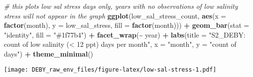\documentclass[
]{article}
\newenvironment{Shaded}{\begin{snugshade}}{\end{snugshade}}
\newcommand{\AttributeTok}[1]{\textcolor[rgb]{0.13,0.29,0.53}{#1}}
\newcommand{\CommentTok}[1]{\textcolor[rgb]{0.56,0.35,0.01}{\textit{#1}}}
\newcommand{\FunctionTok}[1]{\textcolor[rgb]{0.13,0.29,0.53}{\textbf{#1}}}
\newcommand{\NormalTok}[1]{#1}
\newcommand{\SpecialCharTok}[1]{\textcolor[rgb]{0.81,0.36,0.00}{\textbf{#1}}}
\newcommand{\StringTok}[1]{\textcolor[rgb]{0.31,0.60,0.02}{#1}}
\begin{document}
\begin{Shaded}
\begin{Highlighting}[]
\CommentTok{\# this plots low sal stress days only, years with no observations of low salinity stress will not appear in the graph }
\FunctionTok{ggplot}\NormalTok{(low\_sal\_stress\_count, }\FunctionTok{aes}\NormalTok{(}\AttributeTok{x =} \FunctionTok{factor}\NormalTok{(month), }\AttributeTok{y =}\NormalTok{ low\_sal\_stress, }\AttributeTok{fill =} \FunctionTok{factor}\NormalTok{(month))) }\SpecialCharTok{+}
  \FunctionTok{geom\_bar}\NormalTok{(}\AttributeTok{stat =} \StringTok{"identity"}\NormalTok{, }\AttributeTok{fill =} \StringTok{"\#1f77b4"}\NormalTok{) }\SpecialCharTok{+}
  \FunctionTok{facet\_wrap}\NormalTok{(}\SpecialCharTok{\textasciitilde{}}\NormalTok{ year) }\SpecialCharTok{+}
  \FunctionTok{labs}\NormalTok{(}\AttributeTok{title =} \StringTok{"S2\_DEBY: count of low salinity (\textless{} 12 ppt) days per month"}\NormalTok{,}
       \AttributeTok{x =} \StringTok{"month"}\NormalTok{,}
       \AttributeTok{y =} \StringTok{"count of days"}\NormalTok{) }\SpecialCharTok{+}
  \FunctionTok{theme\_minimal}\NormalTok{()}
\end{Highlighting}
\end{Shaded}

\texttt{[image: DEBY\_raw\_env\_files/figure-latex/low-sal-stress-1.pdf]}
\end{document}

